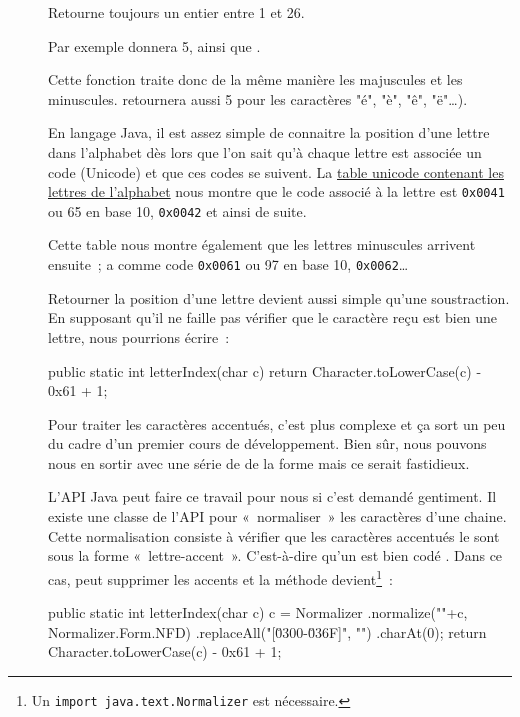 	\begin{description}
	
		\item[]
		Retourne toujours un entier entre 1 et 26. 

		Par exemple  donnera 5, 
		ainsi que . 
		
		Cette fonction traite donc de la même manière les majuscules et les
		minuscules.   retournera aussi 5 pour les caractères "é",
		"è", "ê", "ë"\dots).  

		En langage Java, il est assez simple de connaitre la position d'une
		lettre dans l'alphabet dès lors que l'on sait qu'à chaque lettre est
		associée un code (Unicode) et que ces codes se suivent. La
		\href{https://www.unicode.org/charts/PDF/U0000.pdf}{table unicode
		contenant les lettres de l'alphabet} nous montre que le code associé
		à la lettre  est \texttt{0x0041} ou 65 en base 10, 
		\texttt{0x0042} et ainsi de suite. 
		
		Cette table nous montre également que les lettres minuscules arrivent
		ensuite~;  a comme code \texttt{0x0061} ou 97 en base 10,
		 \texttt{0x0062}…

		Retourner la position d'une lettre devient aussi simple qu'une
		soustraction. En supposant qu'il ne faille pas vérifier que le caractère
		reçu est bien une lettre, nous pourrions écrire~:

		\begin{java}
public static int letterIndex(char c){
	return Character.toLowerCase(c) - 0x61 + 1;
}
		\end{java}

		Pour traiter les caractères accentués, c'est plus complexe et ça sort un
		peu du cadre d'un premier cours de développement. Bien sûr, nous pouvons
		nous en sortir avec une série de  de la forme  mais ce serait fastidieux. 

		L'API Java peut faire ce travail pour nous si c'est demandé gentiment.
		Il existe une classe de l'API pour «~normaliser~» les caractères d'une
		chaine. Cette normalisation consiste à vérifier que les caractères
		accentués le sont sous la forme «~lettre-accent~». C'est-à-dire qu'un
		 est bien codé . Dans ce cas,  peut
		supprimer les accents et la méthode devient\footnote{Un \texttt{import
		java.text.Normalizer} est nécessaire.}~:

		\begin{java}
public static int letterIndex(char c){
	c = Normalizer
		.normalize(""+c, Normalizer.Form.NFD)
		.replaceAll("[\u0300-\u036F]", "")
		.charAt(0);
	return Character.toLowerCase(c) - 0x61 + 1;
}
		\end{java}
		
	\end{description}
	
